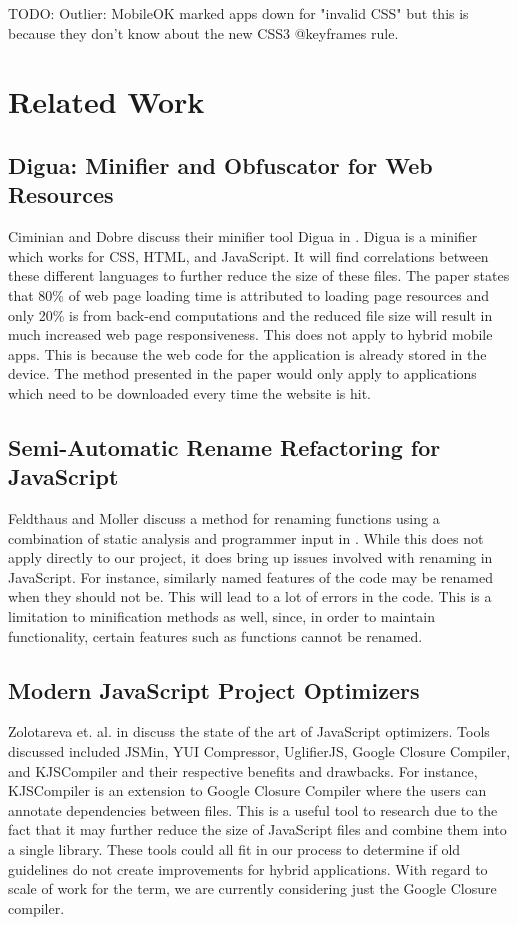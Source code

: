 \documentclass{acm_proc_article-sp}
\begin{document}
TODO: Outlier: MobileOK marked apps down for "invalid CSS" but this is because they don't know about the new CSS3 @keyframes rule.
\section{Related Work}
\subsection{Digua: Minifier and Obfuscator for Web Resources \cite{ciminiandigua}}
Ciminian and Dobre discuss their minifier tool Digua in \cite{ciminiandigua}. 
Digua is a minifier which works for CSS, HTML, and JavaScript.  
It will find correlations between these different languages to further reduce the size of these files.
The paper states that 80\% of web page loading time is attributed to loading page resources and only 20\% is from back-end computations and the reduced file size will result in much increased web page responsiveness.
This does not apply to hybrid mobile apps.
This is because the web code for the application is already stored in the device.
The method presented in the paper would only apply to applications which need to be downloaded every time the website is hit. 

\subsection{Semi-Automatic Rename Refactoring for JavaScript \cite{feldthaus2013semi}}
Feldthaus and Moller discuss a method for renaming functions using a combination of static analysis and programmer input in \cite{feldthaus2013semi}.
While this does not apply directly to our project, it does bring up issues involved with renaming in JavaScript.
For instance, similarly named features of the code may be renamed when they should not be.
This will lead to a lot of errors in the code.
This is a limitation to minification methods as well, since, in order to maintain functionality, certain features such as functions cannot be renamed.

\subsection{Modern JavaScript Project Optimizers \cite{zolotareva2014modern}}
Zolotareva et. al. in \cite{zolotareva2014modern} discuss the state of the art of JavaScript optimizers.
Tools discussed included JSMin, YUI Compressor, UglifierJS, Google Closure Compiler, and KJSCompiler and their respective benefits and drawbacks.
For instance, KJSCompiler is an extension to Google Closure Compiler where the users can annotate dependencies between files.
This is a useful tool to research due to the fact that it may further reduce the size of JavaScript files and combine them into a single library.
These tools could all fit in our process to determine if old guidelines do not create improvements for hybrid applications.
With regard to scale of work for the term, we are currently considering just the Google Closure compiler.
\end{document}
